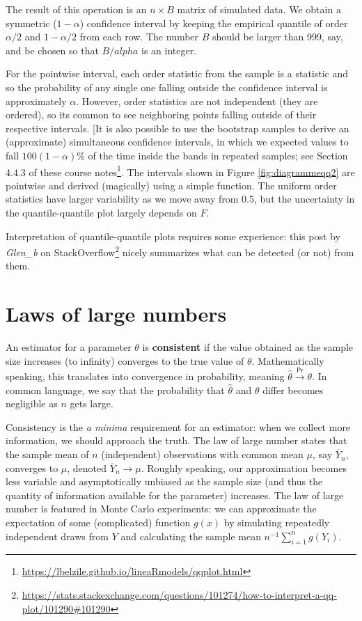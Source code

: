 \documentclass[
  11pt,
  letterpaper,
]{book}
\renewcommand{\href}[2]{#2\footnote{\url{#1}}}
\theoremstyle{definition}
\theoremstyle{definition}
\theoremstyle{definition}
\theoremstyle{remark}
\begin{document}
The result of this operation is an \(n \times B\) matrix of simulated data. We obtain a symmetric (\(1-\alpha\)) confidence interval by keeping the empirical quantile of order \(\alpha/2\) and \(1-\alpha/2\) from each row. The number \(B\) should be larger than 999, say, and be chosen so that \(B/alpha\) is an integer.

For the pointwise interval, each order statistic from the sample is a statistic and so the probability of any single one falling outside the confidence interval is approximately \(\alpha\). However, order statistics are not independent (they are ordered), so its common to see neighboring points falling outside of their respective intervals. {[}It is also possible to use the bootstrap samples to derive an (approximate) simultaneous confidence intervals, in which we expected values to fall \(100(1-\alpha)\)\% of the time inside the bands in repeated samples; \href{https://lbelzile.github.io/lineaRmodels/qqplot.html}{see Section 4.4.3 of these course notes}. The intervals shown in Figure \ref{fig:diagrammeqq2} are pointwise and derived (magically) using a simple function. The uniform order statistics have larger variability as we move away from 0.5, but the uncertainty in the quantile-quantile plot largely depends on \(F\).

Interpretation of quantile-quantile plots requires some experience: \href{https://stats.stackexchange.com/questions/101274/how-to-interpret-a-qq-plot/101290\#101290}{this post by \emph{Glen\_b} on StackOverflow} nicely summarizes what can be detected (or not) from them.

\hypertarget{law-large-numbers}{%
\section{Laws of large numbers}\label{law-large-numbers}}

An estimator for a parameter \(\theta\) is \textbf{consistent} if the value obtained as the sample size increases (to infinity) converges to the true value of \(\theta\). Mathematically speaking, this translates into convergence in probability, meaning \(\hat{\theta} \stackrel{\mathsf{Pr}}{\to} \theta\). In common language, we say that the probability that \(\hat{\theta}\) and \(\theta\) differ becomes negligible as \(n\) gets large.

Consistency is the \emph{a minima} requirement for an estimator: when we collect more information, we should approach the truth. The law of large number states that the sample mean of \(n\) (independent) observations with common mean \(\mu\), say \(\overline{Y}_n\), converges to \(\mu\), denoted \(\overline{Y}_n \rightarrow \mu\). Roughly speaking, our approximation becomes less variable and asymptotically unbiased as the sample size (and thus the quantity of information available for the parameter) increases. The law of large number is featured in Monte Carlo experiments: we can approximate the expectation of some (complicated) function \(g(x)\) by simulating repeatedly independent draws from \(Y\) and calculating the sample mean \(n^{-1} \sum_{i=1}^n g(Y_i)\).
\end{document}
